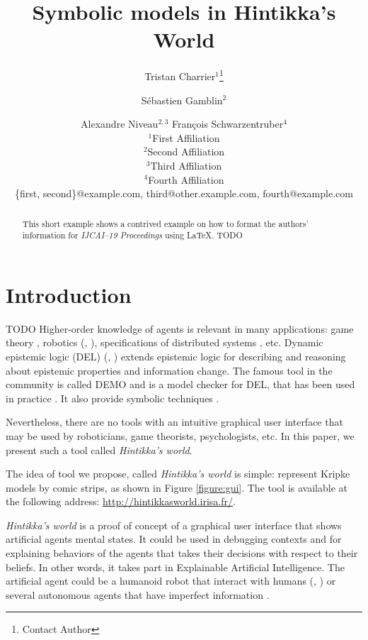 \documentclass{article}
\title{Symbolic models in Hintikka's World}
\author{
Tristan Charrier$^1$\footnote{Contact Author}\and
Sébastien Gamblin$^2$\and
Alexandre Niveau$^{2,3}$\And
François Schwarzentruber$^4$\\
\affiliations
$^1$First Affiliation\\
$^2$Second Affiliation\\
$^3$Third Affiliation\\
$^4$Fourth Affiliation\\
\emails
\{first, second\}@example.com,
third@other.example.com,
fourth@example.com
}
\begin{document}
\newcommand{\mettel}{\textsf{MetTeL2}\xspace}

\maketitle

\begin{abstract}
This short example shows a contrived example on how to format the authors' information for {\it IJCAI--19 Proceedings} using \LaTeX{}.
TODO
\end{abstract}



\section{Introduction}
TODO
Higher-order knowledge of agents is relevant in many applications: game theory \cite{DBLP:journals/ijgt/Aumann99}, robotics (\cite{DBLP:journals/arobots/Scassellati02}, \cite{DBLP:conf/hri/DevinA16}), specifications of distributed systems \cite{DBLP:journals/dc/HalpernF89}, etc. Dynamic epistemic logic (DEL) (\cite{baltag1998logic}, \cite{DitmarschvdHoekKooi})
extends epistemic logic %
for describing and reasoning about epistemic properties and information change.
%
%
The famous tool in the community is called DEMO \cite{van2007demo} and is a model checker for DEL, that has been used in practice \cite{DBLP:conf/paams/DitmarschEHSSS12}.
It also provide symbolic techniques \cite{DBLP:conf/lori/BenthemEGS15}.


Nevertheless, there are no tools with an intuitive graphical user interface that may be used by roboticians, game theorists, psychologists, etc. In this paper, we present such a tool called \emph{Hintikka's world}.%


The idea of tool we propose, called \emph{Hintikka's world} is simple: represent Kripke models by comic strips, as shown in Figure \ref{figure:gui}. The tool is available at the following address:
\url{http://hintikkasworld.irisa.fr/}. 

\emph{Hintikka's world} is a proof of concept of a graphical user interface that shows artificial agents mental states. It could be used in debugging contexts and for explaining behaviors of the agents that takes their decisions with respect to their beliefs. In other words, it takes part in Explainable Artificial Intelligence.
The artificial agent could be a humanoid robot that interact with humans (\cite{DBLP:journals/arobots/Scassellati02}, \cite{DBLP:conf/hri/DevinA16}) or several autonomous agents that have imperfect information \cite{AAAI2018kbps}.
\end{document}
